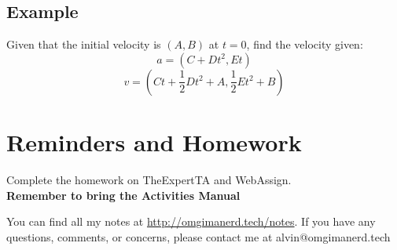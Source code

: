 \documentclass{math}
\begin{document}
\subsection*{Example}
Given that the initial velocity is \( (A,B) \) at \( t = 0 \), find
the velocity given:
\[ a = (C+Dt^2,Et) \]
\[ v = (Ct+\frac{1}{2}Dt^2+A,\frac{1}{2}Et^2+B) \]

\section*{Reminders and Homework}
Complete the homework on TheExpertTA and WebAssign. \\
\textbf{Remember to bring the Activities Manual}

\begin{center}
  You can find all my notes at \url{http://omgimanerd.tech/notes}. If you have
  any questions, comments, or concerns, please contact me at
  alvin@omgimanerd.tech
\end{center}
\end{document}
